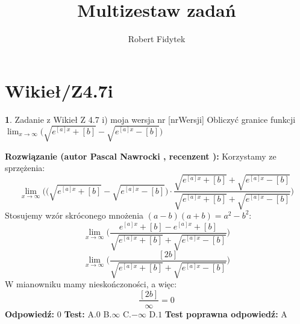 \documentclass[12pt, a4paper]{article}
\title{Multizestaw zadań}
\author{Robert Fidytek}
\date{}
\theoremstyle{definition} %
\newtheorem{zad}{}
\newcommand{\kategoria}[1]{\section{#1}} %
\newcommand{\zadStart}[1]{\begin{zad}#1\newline} %
\newcommand{\zadStop}{\end{zad}}   %
\newcommand{\rozwStart}[2]{\noindent \textbf{Rozwiązanie (autor #1 , recenzent #2): }\newline} %
\newcommand{\rozwStop}{\newline}                                            %
\newcommand{\odpStart}{\noindent \textbf{Odpowiedź:}\newline}    %
\newcommand{\odpStop}{\newline}                                             %
\newcommand{\testStart}{\noindent \textbf{Test:}\newline} %
\newcommand{\testStop}{\newline} %
\newcommand{\kluczStart}{\noindent \textbf{Test poprawna odpowiedź:}\newline} %
\newcommand{\kluczStop}{\newline} %
\begin{document}
\maketitle


\kategoria{Wikieł/Z4.7i}
\zadStart{Zadanie z Wikieł Z 4.7 i) moja wersja nr [nrWersji]}
Obliczyć granice funkcji $\displaystyle{\lim_{x \to \infty}}\big(\sqrt{e^{[a]x}+[b]}-\sqrt{e^{[a]x}-[b]}\big)$
\zadStop
\rozwStart{Pascal Nawrocki}{}
Korzystamy ze sprzężenia:
$$\displaystyle{\lim_{x \to \infty}}\bigg(\big(\sqrt{e^{[a]x}+[b]}-\sqrt{e^{[a]x}-[b]}\big)\cdot\frac{\sqrt{e^{[a]x}+[b]}+\sqrt{e^{[a]x}-[b]}}{\sqrt{e^{[a]x}+[b]}+\sqrt{e^{[a]x}-[b]}}\bigg)$$
Stosujemy wzór skróconego mnożenia $(a-b)(a+b)=a^2-b^2$:
$$\displaystyle{\lim_{x \to \infty}}\big(\frac{e^{[a]x}+[b]-e^{[a]x}+[b]}{\sqrt{e^{[a]x}+[b]}+\sqrt{e^{[a]x}-[b]}}\big)$$
$$\displaystyle{\lim_{x \to \infty}}\big(\frac{[2b]}{\sqrt{e^{[a]x}+[b]}+\sqrt{e^{[a]x}-[b]}}\big)$$
W mianowniku mamy nieskończoności, a więc:
$$\frac{[2b]}{\infty}=0$$
\rozwStop
\odpStart
$0$
\odpStop
\testStart
A.$0$
B.$\infty$
C.$-\infty$
D.$1$
\testStop
\kluczStart
A
\kluczStop
\end{document}
